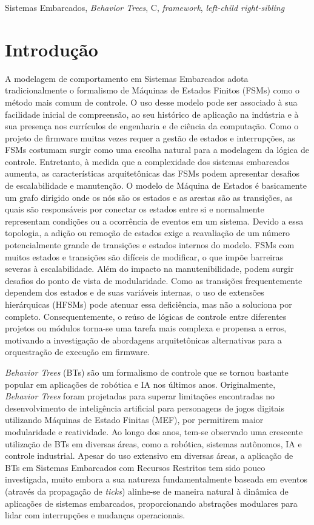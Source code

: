 \documentclass[conference]{IEEEtran}
\begin{document}
\begin{IEEEkeywords}
Sistemas Embarcados, \textit{Behavior Trees}, C, \textit{framework}, \textit{left-child right-sibling}
\end{IEEEkeywords}

\section{Introdução}

A modelagem de comportamento em Sistemas Embarcados adota tradicionalmente o formalismo de Máquinas de Estados Finitos (FSMs) como o método mais comum de controle. O uso desse modelo pode ser associado à sua facilidade inicial de compreensão, ao seu histórico de aplicação na indústria e à sua presença nos currículos de engenharia e de ciência da computação. Como o projeto de firmware muitas vezes requer a gestão de estados e interrupções, as FSMs costumam surgir como uma escolha natural para a modelagem da lógica de controle. Entretanto, à medida que a complexidade dos sistemas embarcados aumenta, as características arquitetônicas das FSMs podem apresentar desafios de escalabilidade e manutenção. O modelo de Máquina de Estados é basicamente um grafo dirigido onde os nós são os estados e as arestas são as transições, as quais são responsáveis por conectar os estados entre si e normalmente representam condições ou a ocorrência de eventos em um sistema. Devido a essa topologia, a adição ou remoção de estados exige a reavaliação de um número potencialmente grande de transições e estados internos do modelo. FSMs com muitos estados e transições são difíceis de modificar, o que impõe barreiras severas à escalabilidade.  
Além do impacto na manutenibilidade, podem surgir desafios do ponto de vista de modularidade. Como as transições frequentemente dependem dos estados e de suas variáveis internas, o uso de extensões hierárquicas (HFSMs) pode atenuar essa deficiência, mas não a soluciona por completo. Consequentemente, o reúso de lógicas de controle entre diferentes projetos ou módulos torna-se uma tarefa mais complexa e propensa a erros, motivando a investigação de abordagens arquitetônicas alternativas para a orquestração de execução em firmware.

\textit{Behavior Trees} (BTs) são um formalismo de controle que se tornou bastante popular em aplicações de robótica e IA nos últimos anos. Originalmente, \textit{Behavior Trees} foram projetadas para superar limitações encontradas no desenvolvimento de inteligência artificial para personagens de jogos digitais utilizando Máquinas de Estado Finitas (MEF), por permitirem maior modularidade e reatividade. Ao longo dos anos, tem-se observado uma crescente utilização de BTs em diversas áreas, como a robótica, sistemas autônomos, IA e controle industrial. Apesar do uso extensivo em diversas áreas, a aplicação de BTs em Sistemas Embarcados com Recursos Restritos tem sido pouco investigada, muito embora a sua natureza fundamentalmente baseada em eventos (através da propagação de \textit{ticks}) alinhe-se de maneira natural à dinâmica de aplicações de sistemas embarcados, proporcionando abstrações modulares para lidar com interrupções e mudanças operacionais.
\end{document}
